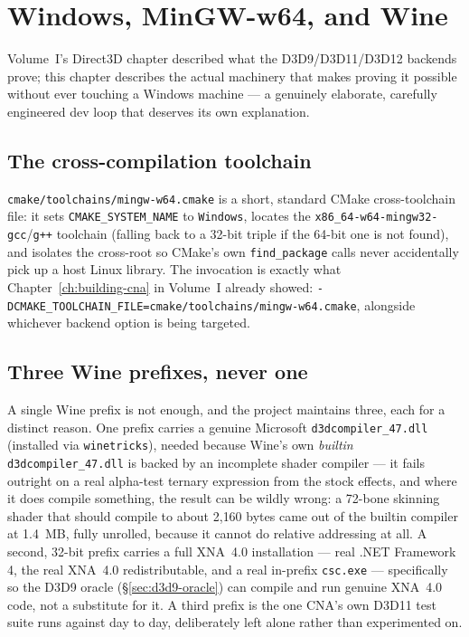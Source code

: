 \chapter{Windows, MinGW-w64, and Wine}
\label{ch:windows-wine}

Volume~I's Direct3D chapter described what the D3D9/D3D11/D3D12 backends prove; this chapter
describes the actual machinery that makes proving it possible without ever touching a
Windows machine --- a genuinely elaborate, carefully engineered dev loop that deserves its
own explanation.

\section{The cross-compilation toolchain}

\texttt{cmake/toolchains/mingw-w64.cmake} is a short, standard CMake cross-toolchain file:
it sets \texttt{CMAKE\_SYSTEM\_NAME} to \texttt{Windows}, locates the
\texttt{x86\_64-w64-mingw32-gcc}/\texttt{g++} toolchain (falling back to a 32-bit triple if
the 64-bit one is not found), and isolates the cross-root so CMake's own
\texttt{find\_package} calls never accidentally pick up a host Linux library. The invocation
is exactly what Chapter~\ref{ch:building-cna} in Volume~I already showed:
\texttt{-DCMAKE\_TOOLCHAIN\_FILE=cmake/toolchains/mingw-w64.cmake}, alongside whichever
backend option is being targeted.

\section{Three Wine prefixes, never one}

A single Wine prefix is not enough, and the project maintains three, each for a distinct
reason. One prefix carries a genuine Microsoft \texttt{d3dcompiler\_47.dll} (installed via
\texttt{winetricks}), needed because Wine's own \emph{builtin} \texttt{d3dcompiler\_47.dll} is
backed by an incomplete shader compiler --- it fails outright on a real alpha-test ternary
expression from the stock effects, and where it does compile something, the result can be
wildly wrong: a 72-bone skinning shader that should compile to about 2{,}160 bytes came out
of the builtin compiler at 1.4~MB, fully unrolled, because it cannot do relative addressing
at all. A second, 32-bit prefix carries a full XNA~4.0 installation --- real .NET Framework 4,
the real XNA~4.0 redistributable, and a real in-prefix \texttt{csc.exe} --- specifically so
the D3D9 oracle (\S\ref{sec:d3d9-oracle}) can compile and run genuine XNA~4.0 code, not a
substitute for it. A third prefix is the one CNA's own D3D11 test suite runs against day to
day, deliberately left alone rather than experimented on.

